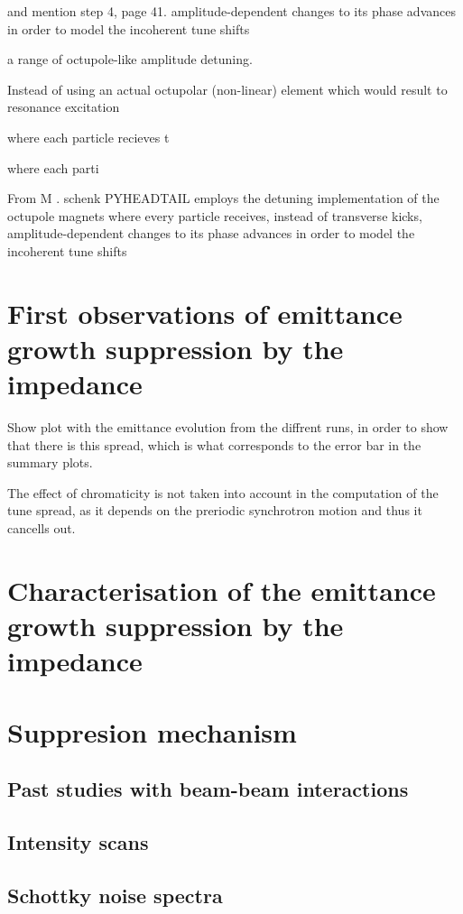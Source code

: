 and mention step 4, page 41.
amplitude-dependent changes to its phase advances in order to model the incoherent tune shifts


a range of octupole-like amplitude detuning.


Instead of using an actual octupolar (non-linear) element which would result to resonance excitation



where each particle recieves t


where each parti

From M . schenk
PYHEADTAIL employs the detuning implementation of the octupole magnets where
every particle receives, instead of transverse kicks, amplitude-dependent changes to its phase advances in order to model the incoherent tune shifts









\section{First observations of emittance growth suppression by the impedance}

Show plot with the emittance evolution from the diffrent runs, in order to show that there is this spread, which is what corresponds to the error bar in the summary plots.


The effect of chromaticity is not taken into account in the computation of the tune spread, as it depends on the preriodic synchrotron motion and thus it cancells out.

\section{Characterisation of the emittance growth suppression by the impedance}

\section{Suppresion mechanism}\label{sec:suppression_mechanism}
\subsection{Past studies with beam-beam interactions}\label{subsec:past_studies_impedance_suppression_BB}
\subsection{Intensity scans}
\subsection{Schottky noise spectra}

